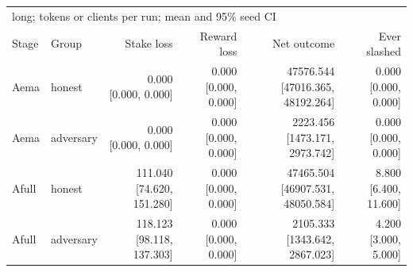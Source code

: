 \begin{tabular}{llrrrr}
\toprule
\multicolumn{6}{l}{long; tokens or clients per run; mean and 95\% seed CI} \\
Stage & Group & Stake loss & Reward loss & Net outcome & Ever slashed \\
\midrule
Aema & honest & \shortstack{0.000\\{}[0.000, 0.000]} & \shortstack{0.000\\{}[0.000, 0.000]} & \shortstack{47576.544\\{}[47016.365, 48192.264]} & \shortstack{0.000\\{}[0.000, 0.000]} \\
Aema & adversary & \shortstack{0.000\\{}[0.000, 0.000]} & \shortstack{0.000\\{}[0.000, 0.000]} & \shortstack{2223.456\\{}[1473.171, 2973.742]} & \shortstack{0.000\\{}[0.000, 0.000]} \\
Afull & honest & \shortstack{111.040\\{}[74.620, 151.280]} & \shortstack{0.000\\{}[0.000, 0.000]} & \shortstack{47465.504\\{}[46907.531, 48050.584]} & \shortstack{8.800\\{}[6.400, 11.600]} \\
Afull & adversary & \shortstack{118.123\\{}[98.118, 137.303]} & \shortstack{0.000\\{}[0.000, 0.000]} & \shortstack{2105.333\\{}[1343.642, 2867.023]} & \shortstack{4.200\\{}[3.000, 5.000]} \\
\bottomrule
\end{tabular}

